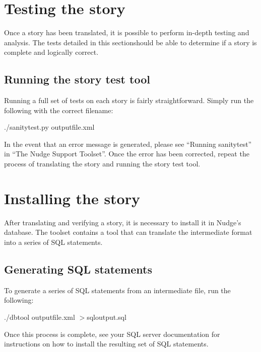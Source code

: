 \documentclass[12pt,letterpaper]{article}
\begin{document}
\section{Testing the story}
Once a story has been translated, it is possible to perform in-depth testing and analysis. The tests detailed in this section\footnotemark[3] should be able to determine if 
a story is complete and logically correct.


\subsection{Running the story test tool}
Running a full set of tests on each story is fairly straightforward. Simply run the following with the correct filename:
\begin{center}
./sanitytest.py outputfile.xml
\end{center}

In the event that an error message is generated, please see ``Running sanitytest'' in ``The Nudge Support Toolset''. Once the error has been corrected, repeat the process
of translating the story and running the story test tool.

\section{Installing the story}
After translating and verifying a story, it is necessary to install it in Nudge's database. The toolset contains a tool that can translate the intermediate
format into a series of SQL statements. 

\subsection{Generating SQL statements}
To generate a series of SQL statements from an intermediate file, run the following:
\begin{center}
./dbtool outputfile.xml $>$sqloutput.sql
\end{center}

Once this process is complete, see your SQL server documentation for instructions on how to install the resulting set of SQL statements.
\end{document}
